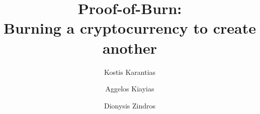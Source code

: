 \title{
Proof-of-Burn:\\ Burning a cryptocurrency to create another
}

\ifanonymous
   \author{}
   \institute{}
\else
   \author{
           Kostis Karantias  \and
           Aggelos Kiayias  \and
           Dionysis Zindros 
   }
\fi
\maketitle
